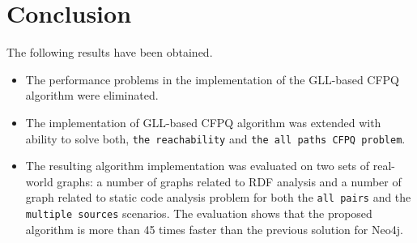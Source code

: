 \section*{Conclusion}\label{sec:current_results}

The following results have been obtained.
\begin{itemize}
    \item The performance problems in the implementation of the GLL-based CFPQ algorithm were eliminated.
    \item The implementation of GLL-based CFPQ algorithm was extended with ability to solve both, \texttt{the reachability} and \texttt{the all paths CFPQ problem}.
    \item The resulting algorithm implementation was evaluated on two sets of real-world graphs: a number of graphs related to RDF analysis and a number of graph related to static code analysis problem for both the \texttt{all pairs} and the \texttt{multiple sources} scenarios. The evaluation shows that the proposed algorithm is more than 45 times faster than the previous solution for Neo4j.
\end{itemize}